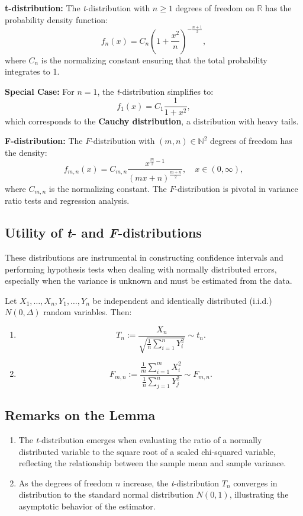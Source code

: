 \documentclass[open=any, 11pt,paper=A4]{scrreprt}
\begin{document}
\textbf{t-distribution:}  
The \textit{t}-distribution with \(n \geq 1\) degrees of freedom on \(\mathbb{R}\) has the probability density function:
\[
f_n(x) = C_n \left( 1 + \frac{x^2}{n} \right)^{-\frac{n+1}{2}},
\]
where \(C_n\) is the normalizing constant ensuring that the total probability integrates to 1.

\textbf{Special Case:} For \(n = 1\), the \textit{t}-distribution simplifies to:
\[
f_1(x) = C_1 \frac{1}{1 + x^2},
\]
which corresponds to the \textbf{Cauchy distribution}, a distribution with heavy tails.

\textbf{F-distribution:}  
The \(F\)-distribution with \((m, n) \in \mathbb{N}^2\) degrees of freedom has the density:
\[
f_{m,n}(x) = C_{m,n} \frac{x^{\frac{m}{2} - 1}}{(m x + n)^{\frac{m+n}{2}}}, \quad x \in (0, \infty),
\]
where \(C_{m,n}\) is the normalizing constant. The \(F\)-distribution is pivotal in variance ratio tests and regression analysis.

\subsection*{Utility of \textit{t}- and \textit{F}-distributions}

These distributions are instrumental in constructing confidence intervals and performing hypothesis tests when dealing with normally distributed errors, especially when the variance is unknown and must be estimated from the data.

\begin{lemma}
Let \(X_1, \dots, X_n, Y_1, \dots, Y_n\) be independent and identically distributed (i.i.d.) \(N(0, \Delta)\) random variables. Then:

\begin{enumerate}
    \item 
    \[
    T_n := \frac{X_n}{\sqrt{\frac{1}{n} \sum_{i=1}^n Y_i^2}} \sim t_n.
    \]
    
    \item 
    \[
    F_{m,n} := \frac{\frac{1}{m} \sum_{i=1}^m X_i^2}{\frac{1}{n} \sum_{j=1}^n Y_j^2} \sim F_{m,n}.
    \]
\end{enumerate}
\end{lemma}

\subsection*{Remarks on the Lemma}

\begin{enumerate}
    \item 
    The \textit{t}-distribution emerges when evaluating the ratio of a normally distributed variable to the square root of a scaled chi-squared variable, reflecting the relationship between the sample mean and sample variance.
    
    \item 
    As the degrees of freedom \(n\) increase, the \textit{t}-distribution \(T_n\) converges in distribution to the standard normal distribution \(N(0, 1)\), illustrating the asymptotic behavior of the estimator.
\end{enumerate}
\end{document}
